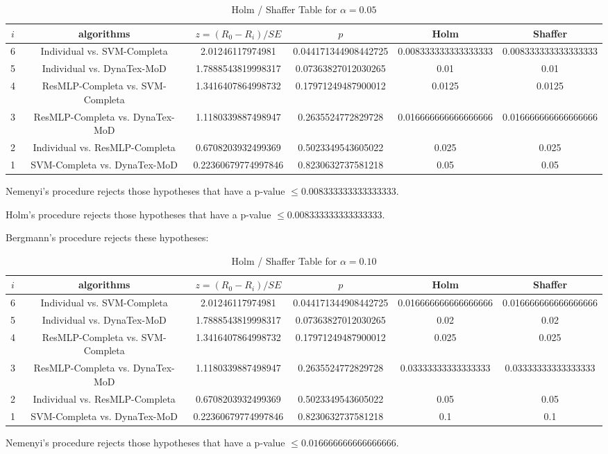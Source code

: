 \documentclass[a4paper,10pt]{article}
\begin{document}
\begin{landscape}
\begin{table}[!htp]
\centering\tiny
\caption{Holm / Shaffer Table for $\alpha=0.05$}
\begin{tabular}{cccccc}
$i$&algorithms&$z=(R_0 - R_i)/SE$&$p$&Holm&Shaffer\\
\hline
6&Individual vs. SVM-Completa&2.01246117974981&0.044171344908442725&0.008333333333333333&0.008333333333333333\\
5&Individual vs. DynaTex-MoD&1.7888543819998317&0.07363827012030265&0.01&0.01\\
4&ResMLP-Completa vs. SVM-Completa&1.3416407864998732&0.17971249487900012&0.0125&0.0125\\
3&ResMLP-Completa vs. DynaTex-MoD&1.1180339887498947&0.2635524772829728&0.016666666666666666&0.016666666666666666\\
2&Individual vs. ResMLP-Completa&0.6708203932499369&0.5023349543605022&0.025&0.025\\
1&SVM-Completa vs. DynaTex-MoD&0.22360679774997846&0.8230632737581218&0.05&0.05\\
\hline
\end{tabular}
\end{table}
Nemenyi's procedure rejects those hypotheses that have a p-value $\le0.008333333333333333$.


Holm's procedure rejects those hypotheses that have a p-value $\le0.008333333333333333$.


Bergmann's procedure rejects these hypotheses:


\begin{itemize}


\end{itemize}


\begin{table}[!htp]
\centering\tiny
\caption{Holm / Shaffer Table for $\alpha=0.10$}
\begin{tabular}{cccccc}
$i$&algorithms&$z=(R_0 - R_i)/SE$&$p$&Holm&Shaffer\\
\hline
6&Individual vs. SVM-Completa&2.01246117974981&0.044171344908442725&0.016666666666666666&0.016666666666666666\\
5&Individual vs. DynaTex-MoD&1.7888543819998317&0.07363827012030265&0.02&0.02\\
4&ResMLP-Completa vs. SVM-Completa&1.3416407864998732&0.17971249487900012&0.025&0.025\\
3&ResMLP-Completa vs. DynaTex-MoD&1.1180339887498947&0.2635524772829728&0.03333333333333333&0.03333333333333333\\
2&Individual vs. ResMLP-Completa&0.6708203932499369&0.5023349543605022&0.05&0.05\\
1&SVM-Completa vs. DynaTex-MoD&0.22360679774997846&0.8230632737581218&0.1&0.1\\
\hline
\end{tabular}
\end{table}
Nemenyi's procedure rejects those hypotheses that have a p-value $\le0.016666666666666666$.



\end{landscape}
\end{document}
